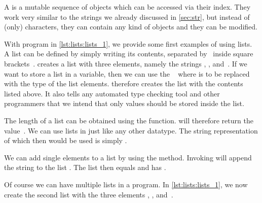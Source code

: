 %
\label{sec:lists}%
%
%
%
%
%
%
%
%
%
%
A  is a mutable sequence of objects which can be accessed via their index.
They work very similar to the strings we already discussed in \cref{sec:str}, but instead of (only) characters, they can contain any kind of objects and they can be modified.%
%
\begin{sloppypar}%
With program  in \cref{lst:lists:lists_1}, we provide some first examples of using lists.
A list can be defined by simply writing its contents, separated by~\pythonilIdx{,} inside square brackets~\pythonil{[...]}\pythonIdx{[\idxdots]}.
 creates a list with three elements, namely the strings , , and~.
If we want to store a list in a variable, then we can use the ~ where  is to be replaced with the type of the list elements.
 therefore creates the list  with the contents listed above.
It also tells any automated type checking tool and other programmers that we intend that only  values should be stored inside the list.%
\end{sloppypar}%
%
The length of a list can be obtained using the  function.
 will therefore return the value~.
We can use lists in  just like any other datatype.
The string representation of  which then would be used is simply .%
%
\begin{sloppypar}%
We can add single elements to a list by using the  method.
Invoking  will append the string  to the list .
The list then equals  and has .%
\end{sloppypar}%
%
Of course we can have multiple lists in a program.
In \cref{lst:lists:lists_1}, we now create the second list  with the three elements , , and~.

